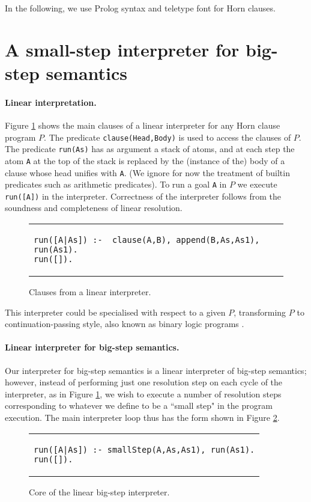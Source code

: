 \documentclass{llncs}
\begin{document}
In the following, we use Prolog syntax and teletype font for Horn clauses.

\section{A small-step interpreter for big-step semantics}\label{small-step-interp}

\paragraph{Linear interpretation.}  Figure \ref{fig:linear-interp} shows the main clauses of a linear interpreter for any Horn clause program $P$.  
The predicate \texttt{clause(Head,Body)} is used to access the clauses of $P$.  The predicate \texttt{run(As)} has as argument a stack of atoms, and
at each step the atom  \texttt{A} at the top of the stack is replaced by the (instance of the) body of a clause whose head unifies with \texttt{A}.
(We ignore for now the treatment of builtin predicates such as arithmetic predicates).
To run a goal \texttt{A} in $P$ we execute \texttt{run([A])} in the interpreter.  
Correctness of the interpreter follows from the soundness and completeness of linear resolution.
\begin{figure}
\begin{tabular}{l}
\begin{lstlisting}
run([A|As]) :-  clause(A,B), append(B,As,As1), run(As1).
run([]).
\end{lstlisting}
\end{tabular}
\caption{Clauses from a linear interpreter.}\label{fig:linear-interp}
\end{figure}

This interpreter could be specialised with respect to a given $P$, transforming $P$ to continuation-passing
style, also known as binary logic programs \cite{Demoen92}.

\paragraph{Linear interpreter for big-step semantics.} 
Our interpreter for big-step semantics is a linear interpreter of big-step semantics; however,  
instead of performing just one resolution step on each cycle of the interpreter,
as in Figure \ref{fig:linear-interp}, we wish to execute a number of resolution steps corresponding to whatever we define to be a ``small step" in the 
program execution.  The main interpreter loop thus has the form shown in Figure \ref{fig:linear-bigstep}.
\begin{figure}
\begin{tabular}{l}
\begin{lstlisting}
run([A|As]) :- smallStep(A,As,As1), run(As1).
run([]).
\end{lstlisting}
\end{tabular}
\caption{Core of the linear big-step interpreter.}\label{fig:linear-bigstep}
\end{figure}
\end{document}
